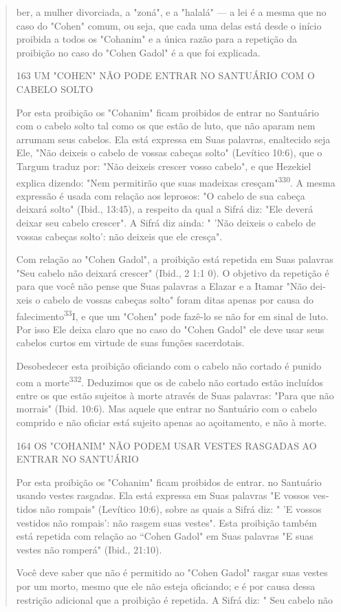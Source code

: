 \begin{quote}ber, a mulher divorciada, a "zoná", e a "halalá" --- a lei é a mesma que
no caso do "Cohen" comum, ou seja, que cada uma delas está desde o
início proibida a todos os "Cohanim" e a única razão para a repetição da
proibição no caso do "Cohen Gadol" é a que foi explicada.

163 UM "COHEN" NÃO PODE ENTRAR NO SANTUÁRIO COM O CABELO SOLTO

Por esta proibição os "Cohanim" ficam proibidos de entrar no San­tuário
com o cabelo solto tal como os que estão de luto, que não aparam nem
arrumam seus cabelos. Ela está expressa em Suas palavras, enaltecido
seja Ele, "Não deixeis o cabelo de vossas cabeças solto" (Levítico
10:6), que o Targum traduz por: "Não deixeis crescer vosso cabelo", e
que Hezekiel explica dizen­do: "Nem permitirão que suas madeixas
cresçam"\textsuperscript{330}. A mesma expressão é usada com relação aos
leprosos: "O cabelo de sua cabeça deixará solto" (Ibid., 13:45), a
respeito da qual a Sifrá diz: "Ele deverá deixar seu cabelo crescer". A
Sifrá diz ainda: " 'Não deixeis o cabelo de vossas cabeças solto': não
deixeis que ele cresça".

Com relação ao "Cohen Gadol", a proibição está repetida em Suas palavras
"Seu cabelo não deixará crescer" (Ibid., 2 1:1 0). O objetivo da
repeti­ção é para que você não pense que Suas palavras a Elazar e a
Itamar "Não dei­xeis o cabelo de vossas cabeças solto" foram ditas
apenas por causa do falecimento\textsuperscript{33}I, e que um "Cohen"
pode fazê-lo se não for em sinal de luto. Por isso Ele deixa claro que
no caso do "Cohen Gadol" ele deve usar seus ca­belos curtos em virtude
de suas funções sacerdotais.

Desobedecer esta proibição oficiando com o cabelo não cortado é punido
com a morte\textsuperscript{332}. Deduzimos que os de cabelo não cortado
estão incluí­dos entre os que estão sujeitos à morte através de Suas
palavras: "Para que não morrais" (Ibid. 10:6). Mas aquele que entrar no
Santuário com o cabelo com­prido e não oficiar está sujeito apenas ao
açoitamento, e não à morte.

164 OS "COHANIM" NÃO PODEM USAR VESTES RASGADAS AO ENTRAR NO SANTUÁRIO

Por esta proibição os "Cohanim" ficam proibidos de entrar. no San­tuário
usando vestes rasgadas. Ela está expressa em Suas palavras "E vossos
ves­tidos não rompais" (Levítico 10:6), sobre as quais a Sifrá diz: " 'E
vossos vesti­dos não rompais': não rasgem suas vestes". Esta proibição
também está repeti­da com relação ao ``Cohen Gadol" em Suas palavras "E
suas vestes não rompe­rá" (Ibid., 21:10).

Você deve saber que não é permitido ao "Cohen Gadol" rasgar suas vestes
por um morto, mesmo que ele não esteja oficiando; e é por causa dessa
restrição adicional que a proibição é repetida. A Sifrá diz: " Seu
cabelo não
\end{quote}

